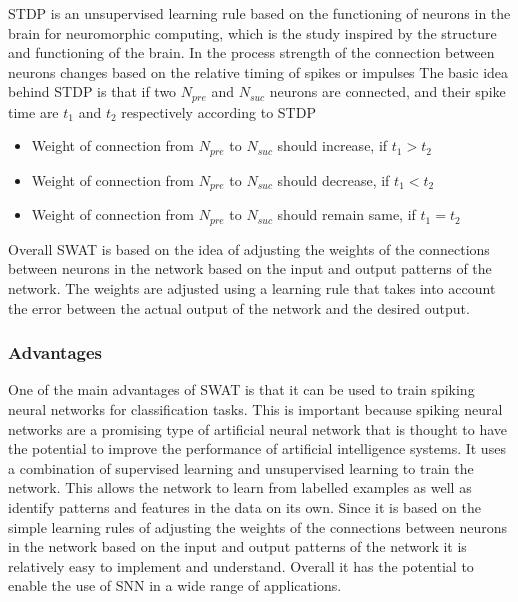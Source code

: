 STDP is an unsupervised learning rule based on the functioning of neurons in
the brain for neuromorphic computing, which is the study inspired by the
structure and functioning of the brain. In the process strength of the
connection between neurons changes based on the relative timing of spikes or
impulses The basic idea behind STDP is that if two $N_{pre}$ and $N_{suc}$
neurons are connected, and their spike time are $t_1$ and $t_2$ respectively
according to STDP \vspace*{-.3pc}
\begin{itemize}
    \item[]Weight of connection from $N_{pre}$ to $N_{suc}$ should  increase, if {\boldmath$t_1>t_2$}
    \item[]Weight of connection from $N_{pre}$ to $N_{suc}$ should  decrease, if {\boldmath$t_1<t_2$}
    \item[]Weight of connection from $N_{pre}$ to $N_{suc}$ should  remain same, if {\boldmath$t_1=t_2$}

\end{itemize}

Overall SWAT is based on the idea of adjusting the weights of the connections
between neurons in the network based on the input and output patterns of the
network. The weights are adjusted using a learning rule that takes into account
the error between the actual output of the network and the desired output.
\subsubsection{Advantages}
One of the main advantages of SWAT is that it can be used to train spiking
neural networks for classification tasks. This is important because spiking
neural networks are a promising type of artificial neural network that is
thought to have the potential to improve the performance of artificial
intelligence systems. It uses a combination of supervised learning and
unsupervised learning to train the network. This allows the network to learn
from labelled examples as well as identify patterns and features in the data on
its own. Since it is based on the simple learning rules of adjusting the
weights of the connections between neurons in the network based on the input
and output patterns of the network it is relatively easy to implement and
understand. Overall it has the potential to enable the use of SNN in a wide
range of applications.
